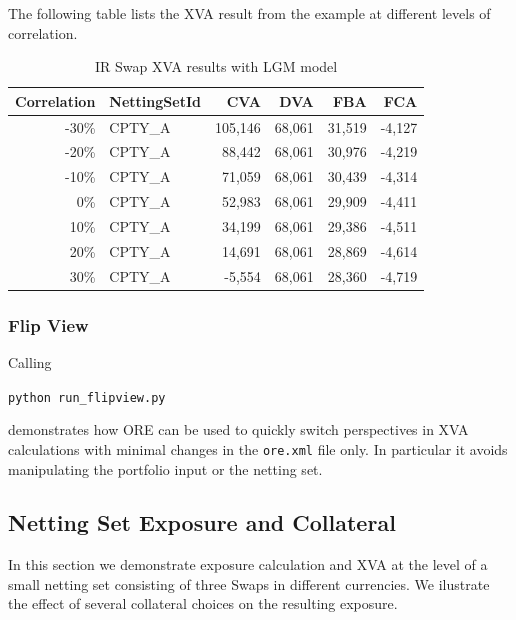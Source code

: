 The following table lists the XVA result from the example at different levels of correlation.

\begin{table}[hbt]
\scriptsize
\begin{center}
\begin{tabular}{|r|l|r|r|r|r|}
\hline
Correlation & NettingSetId & CVA & DVA & FBA & FCA \\
\hline
 -30\%  &  CPTY\_A  & 105,146  &  68,061  &  31,519  &  -4,127 \\
 -20\%  &  CPTY\_A  &  88,442  &  68,061  &  30,976  &  -4,219 \\
 -10\%  &  CPTY\_A  &  71,059  &  68,061  &  30,439  &  -4,314 \\
   0\%  &  CPTY\_A  &  52,983  &  68,061  &  29,909  &  -4,411 \\
  10\%  &  CPTY\_A  &  34,199  &  68,061  &  29,386  &  -4,511 \\
  20\%  &  CPTY\_A  &  14,691  &  68,061  &  28,869  &  -4,614 \\
  30\%  &  CPTY\_A  &  -5,554  &  68,061  &  28,360  &  -4,719 \\
\hline
\end{tabular}
\caption{IR Swap XVA results with LGM model}
\end{center}
\end{table}

\subsubsection{Flip View}\label{example:exposure_flipview}

Calling

\medskip
\centerline{\tt python run\_flipview.py } 
\medskip

demonstrates how ORE can be used to quickly switch perspectives in XVA calculations with minimal changes in the {\tt ore.xml}
file only. In particular it avoids manipulating the portfolio input or the netting set.


\subsection{Netting Set Exposure and Collateral}\label{example:exposurewithcollateral}

In this section we demonstrate exposure calculation and XVA at the level of a small netting set
consisting of three Swaps in different currencies. We ilustrate the effect of several collateral choices
on the resulting exposure.

